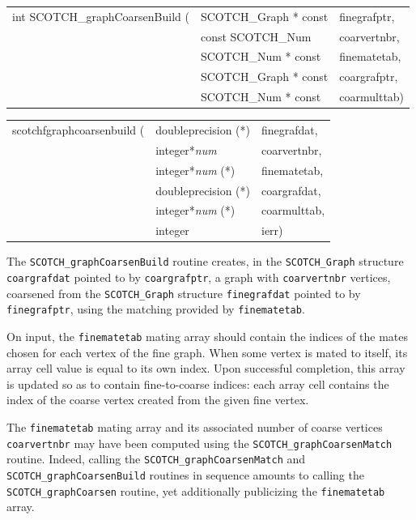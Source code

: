 \begin{itemize}
\progsyn

{\tt\begin{tabular}{l@{}ll}
int SCOTCH\_graphCoarsenBuild ( & SCOTCH\_Graph * const & finegrafptr, \\
                                & const SCOTCH\_Num     & coarvertnbr, \\
                                & SCOTCH\_Num * const   & finematetab, \\
                                & SCOTCH\_Graph * const & coargrafptr, \\
                                & SCOTCH\_Num * const   & coarmulttab) \\
\end{tabular}}

{\tt\begin{tabular}{l@{}ll}
scotchfgraphcoarsenbuild ( & doubleprecision (*)   & finegrafdat, \\
                           & integer*{\it num}     & coarvertnbr, \\
                           & integer*{\it num} (*) & finematetab, \\
                           & doubleprecision (*)   & coargrafdat, \\
                           & integer*{\it num} (*) & coarmulttab, \\
                           & integer               & ierr)
\end{tabular}}

\progdes

The {\tt SCOTCH\_graphCoarsenBuild} routine creates, in the
{\tt SCOTCH\_\lbt Graph} structure {\tt coar\lbt graf\lbt dat} pointed
to by {\tt coar\lbt graf\lbt ptr}, a graph with {\tt coar\lbt vert\lbt nbr}
vertices, coarsened from the {\tt SCOTCH\_\lbt Graph} structure
{\tt fine\lbt graf\lbt dat} pointed to by {\tt fine\lbt graf\lbt ptr},
using the matching provided by {\tt fine\lbt mate\lbt tab}.

On input, the {\tt fine\lbt mate\lbt tab} mating array should contain
the indices of the mates chosen for each vertex of the fine
graph. When some vertex is mated to itself, its array cell value is
equal to its own index. Upon successful completion, this array is
updated so as to contain fine-to-coarse indices: each array cell
contains the index of the coarse vertex created from the given fine
vertex.

The {\tt fine\lbt mate\lbt tab} mating array and its associated number
of coarse vertices {\tt coar\lbt vert\lbt nbr} may have been computed
using the {\tt SCOTCH\_\lbt graph\lbt Coarsen\lbt Match}
routine. Indeed, calling the
{\tt SCOTCH\_\lbt graph\lbt Coarsen\lbt Match} and
{\tt SCOTCH\_\lbt graph\lbt Coarsen\lbt Build} routines in sequence
amounts to calling the {\tt SCOTCH\_\lbt graph\lbt Coarsen} routine,
yet additionally publicizing the {\tt fine\lbt mate\lbt tab} array.


\end{itemize}
